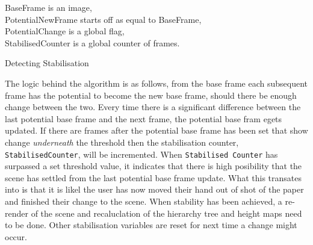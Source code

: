 \documentclass[11pt]{article}
\begin{document}
\begin{algorithm}
\DontPrintSemicolon
BaseFrame is an image,\\
PotentialNewFrame starts off as equal to BaseFrame,\\
PotentialChange is a global flag,\\
StabilisedCounter is a global counter of frames.

\caption{Detecting Stabilisation}
\label{algo:stabilisation}
\end{algorithm}

The logic behind the algorithm is as follows, from the base frame
each subsequent frame has the potential to become the new base frame, should
there be enough change between the two. Every time there is a significant 
difference between the last potential base frame and the next frame, the
potential base fram egets updated. If there are frames after the potential
base frame has been set that show change \textit{underneath} the threshold
then the stabilisation counter, \texttt{StabilisedCounter}, will be 
incremented. When \texttt{Stabilised Counter} has surpassed a set threshold
value, it indicates that there is high posibility that the scene has
settled from the last potential base frame update. What this transates
into is that it is likel the user has now moved their hand out of shot of the
paper and finished their change to the scene. When stability has been
achieved, a re-render of the scene and recaluclation of the hierarchy tree 
and height maps need to be done. Other stabilisation variables are reset for
next time a change might occur.
\end{document}
